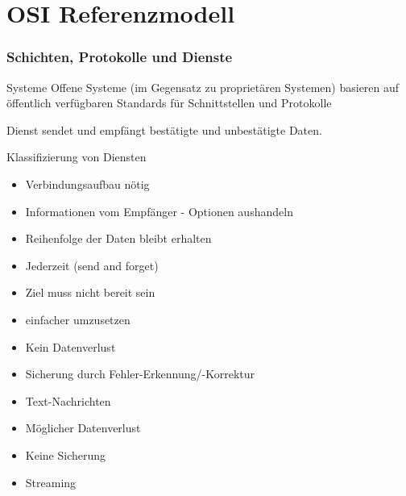 \section{OSI Referenzmodell}
    \subsubsection{Schichten, Protokolle und Dienste}
    \begin{definition}{Systeme}
        Offene Systeme (im Gegensatz zu proprietären Systemen) basieren auf öffentlich verfügbaren Standards für Schnittstellen und Protokolle
    \end{definition}

    \begin{definition}{Dienst}
        sendet und empfängt bestätigte und unbestätigte Daten.
    \end{definition}
    \begin{highlight}{Klassifizierung von Diensten}
    \begin{center}
        \begin{minipage}{0.46\linewidth}
                    \begin{itemize}
                        \item Verbindungsaufbau nötig
                        \item Informationen vom Empfänger - Optionen aushandeln
                        \item Reihenfolge der Daten bleibt erhalten
                    \end{itemize}
                \begin{itemize}
                    \item Jederzeit (send and forget)
                    \item Ziel muss nicht bereit sein
                    \item einfacher umzusetzen
                \end{itemize}
        \end{minipage}
        \hfill\vline\hfill
        \begin{minipage}{0.47\linewidth}
                \begin{itemize}
                    \item Kein Datenverlust
                    \item Sicherung durch Fehler-Erkennung/-Korrektur
                    \item Text-Nachrichten
                \end{itemize}
            \begin{itemize}
                \item Möglicher Datenverlust
                \item Keine Sicherung
                \item Streaming
            \end{itemize}
        \end{minipage}
    \end{center}
\end{highlight}

